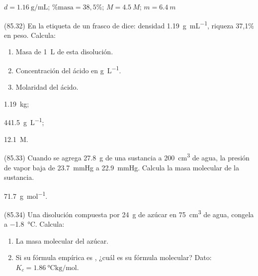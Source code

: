   \begin{solution}
    \( d = \SI{1.16}{\gram\per\milli\liter} \); \( \%\textrm{masa} = 38,5\% \); \( M = \SI{4.5}{M} \); \( m = \SI{6.4}{m} \)
  \end{solution}




  \begin{exercise}[
      tags    = {},
      topics  = {química,química básica},
      source  = {FQ 1B MGH 2016, p85, e32},
    ]
    (85.32) En la etiqueta de un frasco de  dice: densidad \SI{1.19}{\gram\per\milli\liter}, riqueza 37,1\% en peso. Calcula:
    \begin{enumerate}
      \item Masa de \SI{1}{\liter} de esta disolución.
      \item Concentración del ácido en \si{\gram\per\liter}.
      \item Molaridad del ácido.
    \end{enumerate}
  \end{exercise}

  \begin{solution}
    \begin{enumerate*}
      \item \SI{1,19}{\kilo\gram};
      \item \SI{441,5}{\gram\per\liter};
      \item \SI{12,1}{M}.
    \end{enumerate*}
  \end{solution}




  \begin{exercise}[
      tags    = {},
      topics  = {química,química básica},
      source  = {FQ 1B MGH 2016, p85, e33},
    ]
    (85.33) Cuando se agrega \SI{27.8}{\gram} de una sustancia a \SI{200}{\cubic\centi\meter} de agua, la presión de vapor baja de \SI{23.7}{\mmHg} a \SI{22.9}{\mmHg}. Calcula la masa molecular de la sustancia.
  \end{exercise}

  \begin{solution}
    \SI{71.7}{\gram\per\mole}.
  \end{solution}




  \begin{exercise}[
      tags    = {},
      topics  = {química,química básica},
      source  = {FQ 1B MGH 2016, p85, e34},
    ]
    (85.34) Una disolución compuesta por \SI{24}{\gram} de azúcar en \SI{75}{\cubic\centi\meter} de agua, congela a \SI{-1.8}{\celsius}. Calcula:
    \begin{enumerate}
      \item La masa molecular del azúcar.
      \item Si su fórmula empírica es , ¿cuál es su fórmula molecular? Dato: \( K_c = \SI{1.86}{\celsius\kilo\gram\per\mole} \).
    \end{enumerate}
  \end{exercise}

